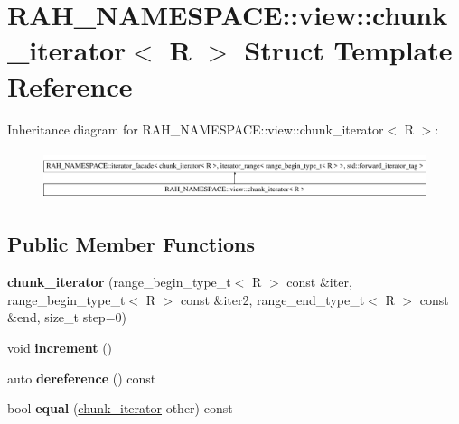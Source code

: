 \hypertarget{struct_r_a_h___n_a_m_e_s_p_a_c_e_1_1view_1_1chunk__iterator}{}\section{R\+A\+H\+\_\+\+N\+A\+M\+E\+S\+P\+A\+CE\+::view\+::chunk\+\_\+iterator$<$ R $>$ Struct Template Reference}
\label{struct_r_a_h___n_a_m_e_s_p_a_c_e_1_1view_1_1chunk__iterator}
Inheritance diagram for R\+A\+H\+\_\+\+N\+A\+M\+E\+S\+P\+A\+CE\+::view\+::chunk\+\_\+iterator$<$ R $>$\+:\begin{figure}[H]
\begin{center}
\leavevmode
\includegraphics[height=1.465969cm]{struct_r_a_h___n_a_m_e_s_p_a_c_e_1_1view_1_1chunk__iterator}
\end{center}
\end{figure}
\subsection*{Public Member Functions}
\begin{DoxyCompactItemize}
\item 
\mbox{\label{struct_r_a_h___n_a_m_e_s_p_a_c_e_1_1view_1_1chunk__iterator_a4515e1b164e80b4c2a5bef345a95e11e}} 
{\bfseries chunk\+\_\+iterator} (range\+\_\+begin\+\_\+type\+\_\+t$<$ R $>$ const \&iter, range\+\_\+begin\+\_\+type\+\_\+t$<$ R $>$ const \&iter2, range\+\_\+end\+\_\+type\+\_\+t$<$ R $>$ const \&end, size\+\_\+t step=0)
\item 
\mbox{\label{struct_r_a_h___n_a_m_e_s_p_a_c_e_1_1view_1_1chunk__iterator_a2e538a85e6fd5d74014b3c0d86413eca}} 
void {\bfseries increment} ()
\item 
\mbox{\label{struct_r_a_h___n_a_m_e_s_p_a_c_e_1_1view_1_1chunk__iterator_a01511046d94dad1e8ea6fe1dd6d4a090}} 
auto {\bfseries dereference} () const
\item 
\mbox{\label{struct_r_a_h___n_a_m_e_s_p_a_c_e_1_1view_1_1chunk__iterator_a10cbb936c835b3a554108db4164c7736}} 
bool {\bfseries equal} (\mbox{\hyperlink{struct_r_a_h___n_a_m_e_s_p_a_c_e_1_1view_1_1chunk__iterator}{chunk\+\_\+iterator}} other) const
\end{DoxyCompactItemize}
